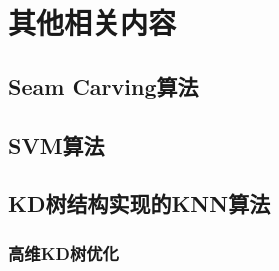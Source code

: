 \chapter{其他相关内容}
\section{Seam Carving算法}
\section{SVM算法}
\section{KD树结构实现的KNN算法}
\subsection{高维KD树优化}

